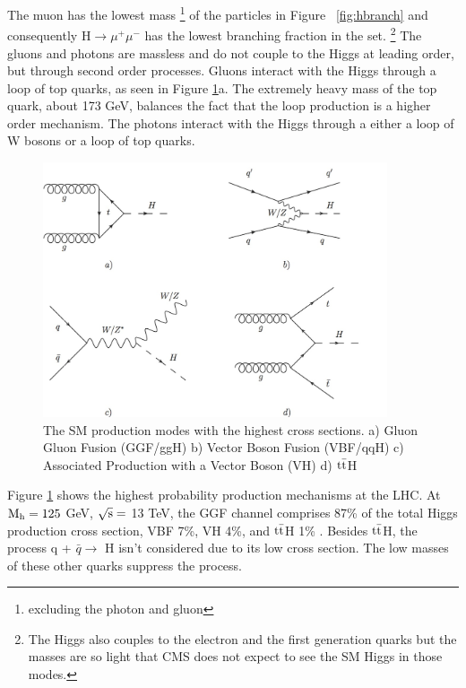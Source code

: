 \documentclass[12pt]{article}
\begin{document}
The muon has the lowest mass \footnote{excluding the photon and gluon} of the particles in Figure ~\ref{fig:hbranch} and consequently H$\rightarrow \mu^{+}\mu^{-}$ has the lowest branching fraction in the set. \footnote{The Higgs also couples to the electron and the first generation quarks but the masses are so light that CMS does not expect to see the SM Higgs in those modes.} The gluons and photons are massless and do not couple to the Higgs at leading order, but through second order processes. Gluons interact with the Higgs through a loop of top quarks, as seen in Figure \ref{fig:hfeynprod}a. The extremely heavy mass of the top quark, about 173 GeV, balances the fact that the loop production is a higher order mechanism. The photons interact with the Higgs through a either a loop of W bosons or a loop of top quarks. 
\begin{figure}[h!]
  \centering
  \includegraphics[width=4in]{images/higgs_production_modes.png}
  \caption
   {The SM production modes with the highest cross sections. a) Gluon Gluon Fusion (GGF/ggH) b) Vector Boson Fusion (VBF/qqH) c) Associated Production with a Vector Boson (VH) d) ${\rm t\bar{t}}$H}
  \label{fig:hfeynprod}
\end{figure}
Figure \ref{fig:hfeynprod} shows the highest probability production mechanisms at the LHC. At ${\rm M_{h} = 125}$ GeV, ${\rm \sqrt{s} =}$ 13 TeV, the GGF channel comprises 87\% of the total Higgs production cross section, VBF 7\%, VH 4\%, and ${\rm t\bar{t}}$H 1\% \cite{crossbranchplots}. Besides ${\rm t\bar{t}}$H, the process q + $\bar{q} \rightarrow$ H isn't considered due to its low cross section. The low masses of these other quarks suppress the process. 
\end{document}
